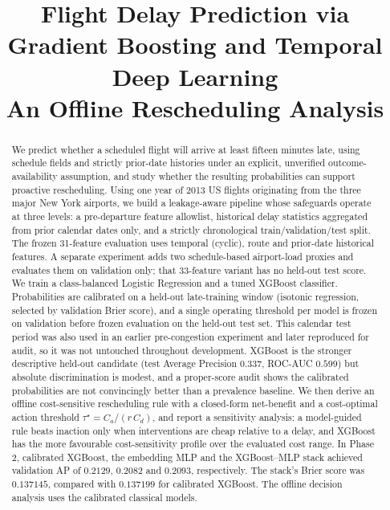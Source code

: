 \documentclass[conference]{IEEEtran}
\begin{document}
\title{Flight Delay Prediction via Gradient Boosting and Temporal Deep Learning\\
An Offline Rescheduling Analysis}

\author{
\and
{}
\and
{}
\and
{}
\and
{}
}

\maketitle

\begin{abstract}
We predict whether a scheduled flight will arrive at least fifteen minutes late,
using schedule fields and strictly prior-date histories under an explicit,
unverified outcome-availability assumption, and study whether the
resulting probabilities can support proactive rescheduling. Using one year of
2013 US flights originating from the three major New York airports, we build a
leakage-aware pipeline whose safeguards operate at three levels: a pre-departure
feature allowlist, historical delay statistics aggregated from prior calendar
dates only, and a strictly chronological train/validation/test split. The
frozen 31-feature evaluation uses temporal (cyclic), route and prior-date
historical features. A separate experiment adds two schedule-based airport-load
proxies and evaluates them on validation only; that 33-feature variant has no
held-out test score. We train
a class-balanced Logistic Regression and a tuned XGBoost classifier. Probabilities
are calibrated on a held-out late-training window (isotonic regression, selected
by validation Brier score), and a single operating threshold per model is frozen
on validation before frozen evaluation on the held-out test set. This calendar
test period was also used in an earlier pre-congestion experiment and later
reproduced for audit, so it was not untouched throughout development. XGBoost
is the stronger descriptive held-out candidate (test Average Precision
$0.337$, ROC-AUC $0.599$) but absolute
discrimination is modest, and a proper-score audit shows the calibrated
probabilities are not convincingly better than a prevalence baseline. We then
derive an offline cost-sensitive rescheduling rule with a closed-form net-benefit
and a cost-optimal action threshold $\tau^\star = C_a/(r\,C_d)$, and report a
sensitivity analysis: a model-guided rule beats inaction only when interventions
are cheap relative to a delay, and XGBoost has the more favourable cost-sensitivity
profile over the evaluated cost range. In Phase 2, calibrated XGBoost, the
embedding MLP and the XGBoost--MLP stack achieved validation AP of $0.2129$,
$0.2082$ and $0.2093$, respectively. The stack's Brier score was $0.137145$,
compared with $0.137199$ for calibrated XGBoost. The offline decision analysis
uses the calibrated classical models.
\end{abstract}
\end{document}
